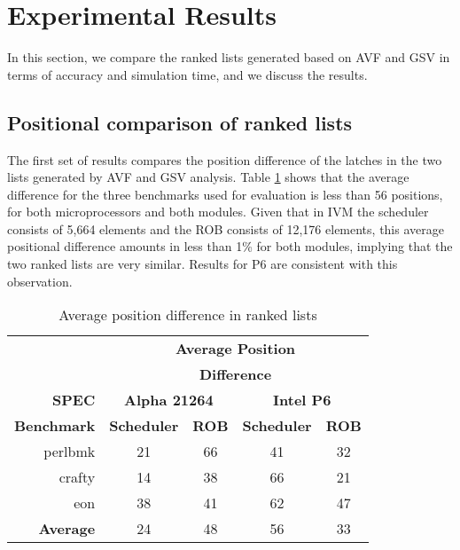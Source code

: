 \documentclass[12pt]{yalephd}
\begin{document}
\section{Experimental Results} \label{sC4sResults}

In this section, we compare the ranked lists generated based on AVF and GSV in terms of accuracy and simulation time, and we discuss the results.

\subsection{Positional comparison of ranked lists}

The first set of results compares the position difference of the latches in the two lists generated by AVF and GSV analysis. Table \ref{sC4tLists_Comparison} shows that the average difference for the three benchmarks used for evaluation is less than 56 positions, for both microprocessors and both modules. Given that in IVM the scheduler consists of 5,664 elements and the ROB consists of 12,176 elements, this average positional difference amounts in less than 1\% for both modules, implying that the two ranked lists are very similar. Results for P6 are consistent with this observation.

\begin{table}[!ht]
\begin{center}
\caption{Average position difference in ranked lists}\label{sC4tLists_Comparison}
\begin{tabular}{||r|c|c|c|c||}
\hline
\hline
                & \multicolumn{4}{|c||}{\bf Average Position} \\
                & \multicolumn{4}{|c||}{\bf Difference} \\
{\bf SPEC}      & \multicolumn{2}{|c}{\bf Alpha 21264} & \multicolumn{2}{|c||}{\bf Intel P6} \\
{\bf Benchmark} & {\bf Scheduler} & {\bf ROB} & {\bf Scheduler} & {\bf ROB} \\
\hline
perlbmk         &  21  & 66  & 41 & 32 \\
crafty	        &  14  & 38  & 66 & 21 \\
eon     	    &  38  & 41  & 62 & 47 \\
\hline
{\bf Average}   &  24  & 48  & 56 & 33 \\
\hline
\hline
\end{tabular}
\end{center}
\end{table}
\end{document}
